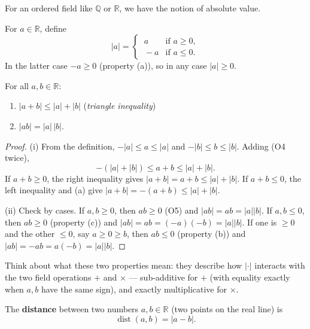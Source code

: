 \documentclass[11pt]{report}
\begin{document}
For an ordered field like $\mathbb{Q}$ or $\mathbb{R}$, we have the notion of absolute value.

\begin{defbox}
For $a \in \mathbb{R}$, define
\[
|a| =
\begin{cases}
\ a & \text{if } a \geq 0, \\
\ -a & \text{if } a \leq 0.
\end{cases}
\]
In the latter case $-a \geq 0$ (property (a)), so in any case $|a| \geq 0$.
\end{defbox}

\begin{thmbox}
For all $a, b \in \mathbb{R}$:
\begin{enumerate}[label=(\roman*)]
    \item $|a + b| \leq |a| + |b|$ \hfill (\emph{triangle inequality})
    \item $|ab| = |a| \, |b|$.
\end{enumerate}
\end{thmbox}

\begin{proof}
(i) From the definition, $-|a| \leq a \leq |a|$ and $-|b| \leq b \leq |b|$. Adding (O4 twice),
\[
-(|a| + |b|) \leq a + b \leq |a| + |b|.
\]
If $a + b \geq 0$, the right inequality gives $|a+b| = a+b \leq |a| + |b|$. If $a + b \leq 0$, the left inequality and (a) give $|a+b| = -(a+b) \leq |a| + |b|$.

(ii) Check by cases. If $a, b \geq 0$, then $ab \geq 0$ (O5) and $|ab| = ab = |a||b|$. If $a, b \leq 0$, then $ab \geq 0$ (property (c)) and $|ab| = ab = (-a)(-b) = |a||b|$. If one is $\geq 0$ and the other $\leq 0$, say $a \geq 0 \geq b$, then $ab \leq 0$ (property (b)) and $|ab| = -ab = a(-b) = |a||b|$.
\end{proof}

\begin{rembox}
Think about what these two properties mean: they describe how $|\cdot|$ interacts with the two field operations $+$ and $\times$ --- sub-additive for $+$ (with equality exactly when $a, b$ have the same sign), and exactly multiplicative for $\times$.
\end{rembox}

\begin{defbox}[Distance]
The \textbf{distance} between two numbers $a, b \in \mathbb{R}$ (two points on the real line) is
\[
\operatorname{dist}(a, b) = |a - b|.
\]
\end{defbox}
\end{document}
